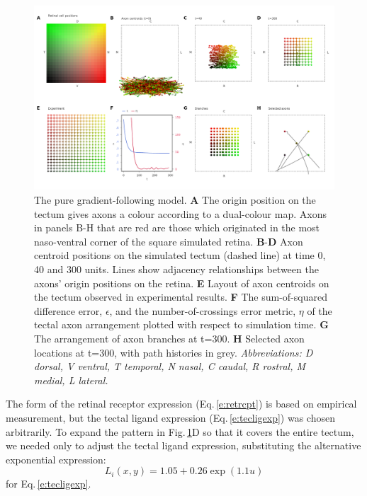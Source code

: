 \documentclass[11pt, a4paper]{article}
\begin{document}
\begin{figure}
\includegraphics[width=\linewidth]{./images/j4_ee_G_wt_fig2_exit_true.png}
\caption{The pure gradient-following model. \textbf{A} The origin position
on the tectum gives axons a colour according to a dual-colour map. Axons in
panels B-H that are red are those which originated in the most naso-ventral
corner of the square simulated retina. \textbf{B}-\textbf{D} Axon centroid
positions on the simulated tectum (dashed line) at time 0, 40 and 300
units. Lines show adjacency relationships between the axons' origin positions
on the retina. \textbf{E} Layout of axon centroids on the tectum observed in
experimental results. \textbf{F} The sum-of-squared difference error,
$\epsilon$, and the number-of-crossings error metric, $\eta$ of the tectal axon
arrangement plotted with respect to simulation time. \textbf{G} The
arrangement of axon branches at t=300. \textbf{H} Selected axon locations at
t=300, with path histories in grey.  \emph{Abbreviations: D dorsal, V ventral, T
temporal, N nasal, C caudal, R rostral, M medial, L lateral.}}
\label{f:G}
\end{figure}

The form of the retinal receptor expression (Eq.\,\ref{e:retrcpt}) is based on
empirical measurement, but the tectal ligand expression
(Eq.\,\ref{e:tecligexp}) was chosen arbitrarily. To expand the pattern in
Fig.\,\ref{f:G}D so that it covers the entire tectum, we needed only to
adjust the tectal ligand expression, substituting the alternative exponential
expression:
%
\begin{equation} \label{e:tecligexp2}
L_i(x,y) = 1.05 + 0.26 \exp(1.1 u)
\end{equation}
%
for Eq.\,\ref{e:tecligexp}.
\end{document}

